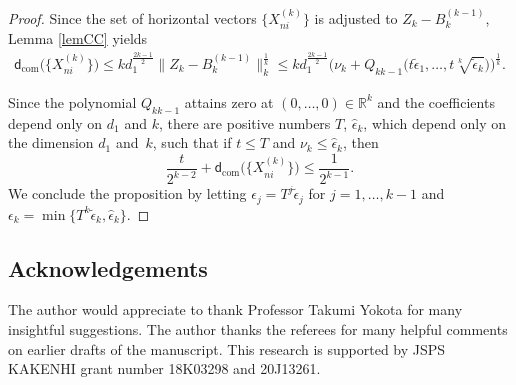 \documentclass[10pt,a4paper]{amsart}
\numberwithin{equation}{section}
\newcommand{\R}{\mathbb{R}}
\begin{document}
\begin{proof}
Since the set of horizontal vectors $\bigl\{X_{ni}^{(k)}\bigr\}$ is adjusted to $Z_k-B_k^{(k-1)}$,
Lemma \ref{lemCC} yields
\begin{gather*}
\mathsf{d}_{\mathrm{com}}\big(\bigl\{X_{ni}^{(k)}\bigr\}\big)\leq kd_1^{\frac{2k-1}{2}}\big\|Z_k-B_k^{(k-1)}\big\|_k^{\frac{1}{k}}
\leq kd_1^{\frac{2k-1}{2}}\big(\nu_k+Q_{kk-1}\big(t\tilde{\epsilon}_1, \dots,t\sqrt[k]{\tilde{\epsilon}_{k}}\big)\big)^{\frac{1}{k}}.
\end{gather*}

Since the polynomial $Q_{kk-1}$ attains zero at $(0,\dots,0)\in \R^{k}$ and the coefficients depend only on $d_1$ and $k$,
there are positive numbers $T$, $\hat{\epsilon}_k$,
which depend only on the dimension $d_1$ and~$k$,
such that if $t\leq T$ and $\nu_k\leq \hat{\epsilon}_k$,
then
\[
\frac{t}{2^{k-2}}+\mathsf{d}_{\mathrm{com}}\big(\bigl\{X_{ni}^{(k)}\bigr\}\big)\leq \frac{1}{2^{k-1}}.
\]
We conclude the proposition by letting $\epsilon_j=T^j\tilde{\epsilon}_j$ for $j=1,\dots,k-1$ and $\epsilon_k=\min\big\{T^k\tilde{\epsilon}_k,\hat{\epsilon}_k\big\}$.
\end{proof}


\subsection*{Acknowledgements}

The author would appreciate to thank Professor Takumi Yokota for many insightful suggestions.
The author thanks the referees for many helpful comments on earlier drafts of the manuscript.
This research is supported by JSPS KAKENHI grant number 18K03298 and 20J13261.

\end{document}
